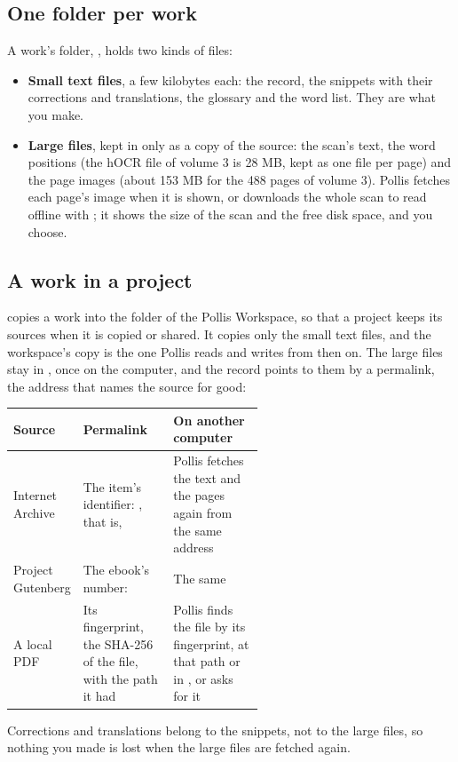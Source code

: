 \subsection{One folder per work}
A work's folder, , holds two kinds of files:
\begin{itemize}
  \item \textbf{Small text files}, a few kilobytes each: the record, the snippets with their corrections and
    translations, the glossary and the word list. They are what you make.
  \item \textbf{Large files}, kept in  only as a copy of the source: the scan's text, the word positions
    (the hOCR file of volume 3 is 28 MB, kept as one file per page) and the page images (about 153 MB for the 488 pages
    of volume 3). Pollis fetches each page's image when it is shown, or downloads the whole scan to read offline with
    ; it shows the size of the scan and the free disk space, and you choose.
\end{itemize}

\subsection{A work in a project}
 copies a work into the  folder of the Pollis Workspace, so that a project keeps its
sources when it is copied or shared. It copies only the small text files, and the workspace's copy is the one Pollis
reads and writes from then on. The large files stay in , once on the computer,
and the record points to them by a permalink, the address that names the source for good:
\begin{center}\small
\begin{tabularx}{\linewidth}{@{}p{0.2\linewidth}p{0.36\linewidth}L@{}}
\toprule
\textbf{Source} & \textbf{Permalink} & \textbf{On another computer} \\
\midrule
Internet Archive & The item's identifier: , that is,
   & Pollis fetches the text and the pages again from the same address \\
Project Gutenberg & The ebook's number:  & The same \\
A local PDF & Its fingerprint, the SHA-256 of the file, with the path it had & Pollis finds the file by its
  fingerprint, at that path or in , or asks for it \\
\bottomrule
\end{tabularx}
\end{center}
Corrections and translations belong to the snippets, not to the large files, so nothing you made is lost when the large
files are fetched again.

